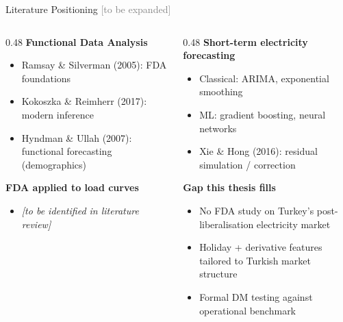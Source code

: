\documentclass[10pt,aspectratio=169]{beamer}
\begin{document}
\begin{frame}{Literature Positioning \textcolor{gray}{\small [to be expanded]}}
  \begin{columns}
    \begin{column}{0.48\textwidth}
      \textbf{Functional Data Analysis}
      \vspace{0.2em}
      \begin{itemize}
        \item Ramsay \& Silverman (2005): FDA foundations
        \item Kokoszka \& Reimherr (2017): modern inference
        \item Hyndman \& Ullah (2007): functional forecasting (demographics)
      \end{itemize}
      \vspace{0.4em}
      \textbf{FDA applied to load curves}
      \begin{itemize}
        \item \textit{[to be identified in literature review]}
      \end{itemize}
    \end{column}
    \begin{column}{0.48\textwidth}
      \textbf{Short-term electricity forecasting}
      \vspace{0.2em}
      \begin{itemize}
        \item Classical: ARIMA, exponential smoothing
        \item ML: gradient boosting, neural networks
        \item Xie \& Hong (2016): residual simulation / correction
      \end{itemize}
      \vspace{0.4em}
      \textbf{Gap this thesis fills}
      \begin{itemize}
        \item No FDA study on Turkey's post-liberalisation electricity market
        \item Holiday + derivative features tailored to Turkish market structure
        \item Formal DM testing against operational benchmark
      \end{itemize}
    \end{column}
  \end{columns}
\end{frame}
\end{document}
